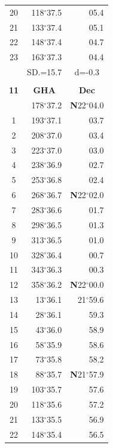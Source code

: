 \documentclass[10pt, a4paper]{report}
\begin{document}
\begin{scriptsize}
\begin{tabular*}{0.2\textwidth}[t]{@{\extracolsep{\fill}}|c|rr|}
20 & 118$^\circ$37.5 & 05.4\\
21 & 133$^\circ$37.4 & \raisebox{0.24ex}{\boldmath$\cdot$~\boldmath$\cdot$~~}05.1\\
22 & 148$^\circ$37.4 & 04.7\\
23 & 163$^\circ$37.3 & 04.4\\
\hline
\rule{0pt}{2.4ex} & \multicolumn{1}{c}{SD.=15.7} & \multicolumn{1}{c|}{d=-0.3}\\
\hline
\multicolumn{1}{c}{}\\[-0.5ex]\hline
\multicolumn{1}{|c|}{\rule{0pt}{2.6ex}\textbf{11}} & \multicolumn{1}{c}{\textbf{GHA}} & \multicolumn{1}{c|}{\textbf{Dec}}\\
\hline\rule{0pt}{2.6ex}\noindent
0 & 178$^\circ$37.2 & \textbf{N}22$^\circ$04.0\\
1 & 193$^\circ$37.1 & 03.7\\
2 & 208$^\circ$37.0 & 03.4\\
3 & 223$^\circ$37.0 & \raisebox{0.24ex}{\boldmath$\cdot$~\boldmath$\cdot$~~}03.0\\
4 & 238$^\circ$36.9 & 02.7\\
5 & 253$^\circ$36.8 & 02.4\\[2Pt]
6 & 268$^\circ$36.7 & \textbf{N}22$^\circ$02.0\\
7 & 283$^\circ$36.6 & 01.7\\
8 & 298$^\circ$36.5 & 01.3\\
9 & 313$^\circ$36.5 & \raisebox{0.24ex}{\boldmath$\cdot$~\boldmath$\cdot$~~}01.0\\
10 & 328$^\circ$36.4 & 00.7\\
11 & 343$^\circ$36.3 & 00.3\\[2Pt]
12 & 358$^\circ$36.2 & \textbf{N}22$^\circ$00.0\\
13 & 13$^\circ$36.1 & 21$^\circ$59.6\\
14 & 28$^\circ$36.1 & 59.3\\
15 & 43$^\circ$36.0 & \raisebox{0.24ex}{\boldmath$\cdot$~\boldmath$\cdot$~~}58.9\\
16 & 58$^\circ$35.9 & 58.6\\
17 & 73$^\circ$35.8 & 58.2\\[2Pt]
18 & 88$^\circ$35.7 & \textbf{N}21$^\circ$57.9\\
19 & 103$^\circ$35.7 & 57.6\\
20 & 118$^\circ$35.6 & 57.2\\
21 & 133$^\circ$35.5 & \raisebox{0.24ex}{\boldmath$\cdot$~\boldmath$\cdot$~~}56.9\\
22 & 148$^\circ$35.4 & 56.5\\

\end{tabular*}
\end{scriptsize}
\end{document}

